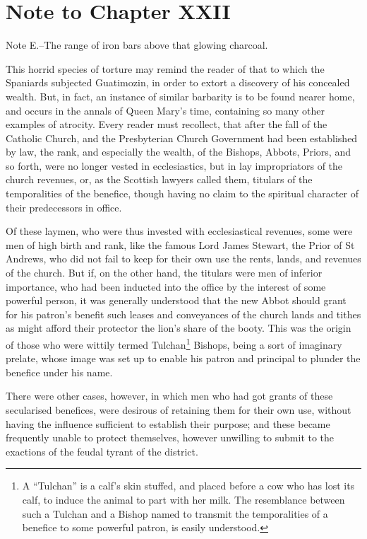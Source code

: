 \section*{Note to Chapter XXII}\label{noteCXXII}

Note E.--The range of iron bars above that glowing charcoal.

This horrid species of torture may remind the reader of that to which
the Spaniards subjected Guatimozin, in order to extort a discovery of
his concealed wealth. But, in fact, an instance of similar barbarity is
to be found nearer home, and occurs in the annals of Queen Mary's time,
containing so many other examples of atrocity. Every reader must
recollect, that after the fall of the Catholic Church, and the
Presbyterian Church Government had been established by law, the rank,
and especially the wealth, of the Bishops, Abbots, Priors, and so forth,
were no longer vested in ecclesiastics, but in lay impropriators of the
church revenues, or, as the Scottish lawyers called them, titulars of
the temporalities of the benefice, though having no claim to the
spiritual character of their predecessors in office.

Of these laymen, who were thus invested with ecclesiastical revenues,
some were men of high birth and rank, like the famous Lord James
Stewart, the Prior of St Andrews, who did not fail to keep for their own
use the rents, lands, and revenues of the church. But if, on the other
hand, the titulars were men of inferior importance, who had been
inducted into the office by the interest of some powerful person, it was
generally understood that the new Abbot should grant for his patron's
benefit such leases and conveyances of the church lands and tithes as
might afford their protector the lion's share of the booty. This was the
origin of those who were wittily termed Tulchan\footnote{A ``Tulchan''
is a calf's skin stuffed, and placed
before a cow who has lost its calf, to induce the animal to part with
her milk. The resemblance between such a Tulchan and a Bishop named to
transmit the temporalities of a benefice to some powerful patron, is
easily understood.} Bishops, being a sort of imaginary prelate, whose
image was set up to
enable his patron and principal to plunder the benefice under his name.

There were other cases, however, in which men who had got grants of
these secularised benefices, were desirous of retaining them for their
own use, without having the influence sufficient to establish their
purpose; and these became frequently unable to protect themselves,
however unwilling to submit to the exactions of the feudal tyrant of the
district.

